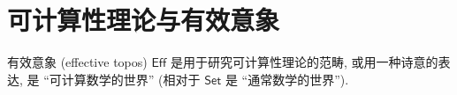 \section{可计算性理论与有效意象}

有效意象 (effective topos) $\mathsf {Eff}$ 是用于研究可计算性理论的范畴, 或用一种诗意的表达, 是 ``可计算数学的世界'' (相对于 $\mathsf {Set}$ 是 ``通常数学的世界'').


